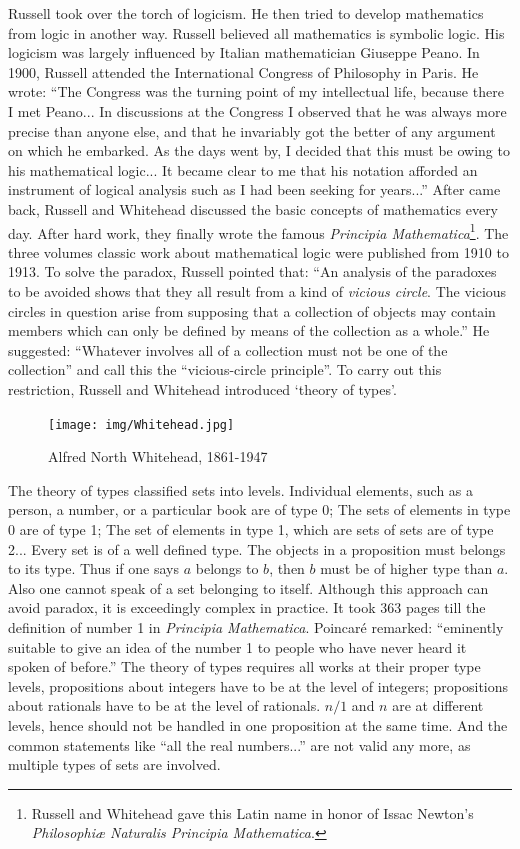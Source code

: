 \documentclass{article}
\begin{document}
Russell took over the torch of logicism. He then tried to develop mathematics from logic in another way. Russell believed all mathematics is symbolic logic. His logicism was largely influenced by Italian mathematician Giuseppe Peano. In 1900, Russell attended the International Congress of Philosophy in Paris. He wrote: ``The Congress was the turning point of my intellectual life, because there I met Peano... In discussions at the Congress I observed that he was always more precise than anyone else, and that he invariably got the better of any argument on which he embarked. As the days went by, I decided that this must be owing to his mathematical logic... It became clear to me that his notation afforded an instrument of logical analysis such as I had been seeking for years...'' After came back, Russell and Whitehead discussed the basic concepts of mathematics every day. After hard work, they finally wrote the famous {\em Principia Mathematica}\footnote{Russell and Whitehead gave this Latin name in honor of Issac Newton's {\em Philosophiæ Naturalis Principia Mathematica}.}. The three volumes classic work about mathematical logic were published from 1910 to 1913. To solve the paradox, Russell pointed that: ``An analysis of the paradoxes to be avoided shows that they all result from a kind of {\em vicious circle}. The vicious circles in question arise from supposing that a collection of objects may contain members which can only be defined by means of the collection as a whole.'' He suggested: ``Whatever involves all of a collection must not be one of the collection'' and call this the ``vicious-circle principle''. To carry out this restriction, Russell and Whitehead introduced `theory of types'.

\begin{figure}
 \centering
 \texttt{[image: img/Whitehead.jpg]}
 \captionsetup{labelformat=empty}
 \caption{Alfred North Whitehead, 1861-1947}
 \label{fig:Whitehead}
\end{figure}

The theory of types classified sets into levels. Individual elements, such as a person, a number, or a particular book are of type 0; The sets of elements in type 0 are of type 1; The set of elements in type 1, which are sets of sets are of type 2... Every set is of a well defined type. The objects in a proposition must belongs to its type. Thus if one says $a$ belongs to $b$, then $b$ must be of higher type than $a$. Also one cannot speak of a set belonging to itself. Although this approach can avoid paradox, it is exceedingly complex in practice. It took 363 pages till the definition of number 1 in {\em Principia Mathematica}. Poincaré remarked: ``eminently suitable to give an idea of the number 1 to people who have never heard it spoken of before.'' The theory of types requires all works at their proper type levels, propositions about integers have to be at the level of integers; propositions about rationals have to be at the level of rationals. $n/1$ and $n$ are at different levels, hence should not be handled in one proposition at the same time. And the common statements like ``all the real numbers...'' are not valid any more, as multiple types of sets are involved.
\end{document}
